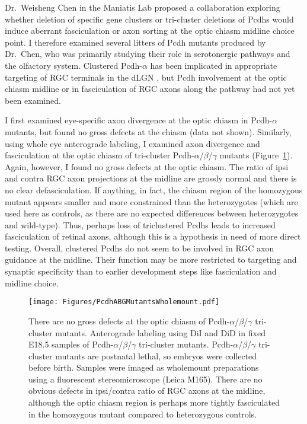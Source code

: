 Dr.~Weisheng Chen in the Maniatis Lab proposed a collaboration exploring whether deletion of specific gene clusters or tri-cluster deletions of Pcdhs would induce aberrant fasciculation or axon sorting at the optic chiasm midline choice point.
I therefore examined several litters of Pcdh mutants produced by Dr.~Chen, who was primarily studying their role in serotonergic pathways and the olfactory system.
Clustered Pcdh-$\alpha$ has been implicated in appropriate targeting of RGC terminals in the dLGN \cite{meguro2015impaired}, but Pcdh involvement at the optic chiasm midline or in fasciculation of RGC axons along the pathway had not yet been examined.

I first examined eye-specific axon divergence at the optic chiasm in Pcdh-$\alpha$ mutants, but found no gross defects at the chiasm (data not shown).
Similarly, using whole eye anterograde labeling, I examined axon divergence and fasciculation at the optic chiasm of tri-cluster Pcdh-$\alpha$/$\beta$/$\gamma$ mutants (Figure~\ref{PcdhABGMutantsWholemount}).
Again, however, I found no gross defects at the optic chiasm.
The ratio of ipsi and contra RGC axon projections at the midline are grossly normal and there is no clear defasciculation.
If anything, in fact, the chiasm region of the homozygous mutant appears smaller and more constrained than the heterozygotes (which are used here as controls, as there are no expected differences between heterozygotes and wild-type).
Thus, perhaps loss of triclustered Pcdhs leads to increased fasciculation of retinal axons, although this is a hypothesis in need of more direct testing.
Overall, clustered Pcdhs do not seem to be involved in RGC axon guidance at the midline.
Their function may be more restricted to targeting and synaptic specificity than to earlier development steps like fasciculation and midline choice.
\begin{figure}[hbtp]
    \begin{center}
        \texttt{[image: Figures/PcdhABGMutantsWholemount.pdf]}
        \caption[There are no gross defects at the optic chiasm of Pcdh-$\alpha$/$\beta$/$\gamma$ tri-cluster mutants.]
        {There are no gross defects at the optic chiasm of Pcdh-$\alpha$/$\beta$/$\gamma$ tri-cluster mutants.
        Anterograde labeling using DiI and DiD in fixed E18.5 samples of Pcdh-$\alpha$/$\beta$/$\gamma$ tri-cluster mutants.
        Pcdh-$\alpha$/$\beta$/$\gamma$ tri-cluster mutants are postnatal lethal, so embryos were collected before birth.
        Samples were imaged as wholemount preparations using a fluorescent stereomicroscope (Leica M165).
        There are no obvious defects in ipsi/contra ratio of RGC axons at the midline, although the optic chiasm region is perhaps more tightly fasciculated in the homozygous mutant compared to heterozygous controls.
        }
        \label{PcdhABGMutantsWholemount}
    \end{center}
\end{figure}
